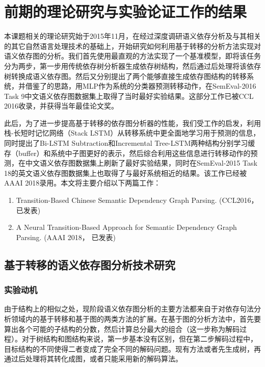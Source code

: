 \section{前期的理论研究与实验论证工作的结果}

本课题相关的理论研究始于2015年11月，在经过深度调研语义依存分析及与其相关的其它自然语言处理技术的基础上，开始研究如何利用基于转移的分析方法实现对语义依存图的分析。我们首先使用最直观的方法实现了一个基准模型，即将该任务分为两步，第一步用传统依存树分析器生成依存树结构，然后通过后处理将该依存树转换成语义依存图。然后又分别提出了两个能够直接生成依存图结构的转移系统，并借鉴了的思路，用MLP作为系统的分类器预测转移动作，在SemEval-2016 Task 9中文语义依存图数据集上取得了当时最好实验结果。这部分工作已被CCL 2016收录，并获得当年最佳论文奖。

此后，为了进一步提高基于转移的依存图分析器的性能，我们受工作的启发，利用栈-长短时记忆网络（Stack LSTM）从转移系统中更全面地学习用于预测的信息，同时提出了Bi-LSTM Subtraction和Incremental Tree-LSTM两种结构分别学习缓存（buffer）和系统中子图更好的表示，然后综合利用这些信息进行转移动作的预测，在中文语义依存图数据集上刷新了最好实验结果，同时在SemEval-2015 Task 18的英文语义依存图数据集上也取得了与最好系统相近的结果。该工作已经被AAAI 2018录用。本文将主要介绍以下两篇工作：

\begin{enumerate}
	\item Transition-Based Chinese Semantic Dependency Graph Parsing. (CCL2016， 已发表)
	\item A Neural Transition-Based Approach for Semantic Dependency Graph Parsing. (AAAI 2018， 已发表)
\end{enumerate}


\subsection{基于转移的语义依存图分析技术研究}
\subsubsection{实验动机}

由于结构上的相似之处，现阶段语义依存图分析的主要方法都来自于对依存句法分析领域内的基于转移和基于图的两类方法的扩展。在基于图的分析方法中，首先要算出各个可能的子结构的分数，然后计算总分最大的组合（这一步称为解码过程）。对于树结构和图结构来说，第一步基本没有区别，但在第二步解码过程中，目标结构的不同使得二者变成了完全不同的解码问题。现有方法或者先生成树，再通过后处理将其转化成图，或者只能采用新的解码算法。

